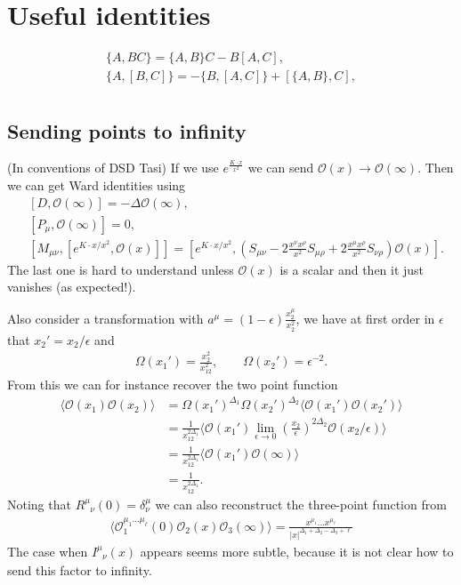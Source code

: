 \documentclass[letterpaper]{article}
\let\Oldsection\section
\renewcommand{\section}{\FloatBarrier\Oldsection}
\let\Oldsubsection\subsection
\renewcommand{\subsection}{\FloatBarrier\Oldsubsection}
\def\Om{{\mathcal{O}}}
\def\ph{\phantom}
\def \ph{\phantom}
\begin{document}
\section{Useful identities}

\begin{align}
 \{ A, B C \} = \{ A, B \} C - B [A, C], \\
 \{ A, [B, C] \} = - \{ B, [A, C] \}  + [ \{A, B \}, C], \\
\end{align}

\subsection{Sending points to infinity}

(In conventions of DSD Tasi) If we use $e^{\frac{K \cdot x}{x^2}}$ we can send $\Om(x) \to \Om(\infty)$. Then we can get Ward identities using
\begin{align}
 & [D, \Om(\infty)] = -\Delta \Om(\infty), \\
 & [P_\mu, \Om(\infty)] = 0, \\
 & [M_{\mu\nu}, [e^{K\cdot x/x^2}, \Om(x)]] 
 = \left[ e^{K\cdot x/x^2}, \left(
    S_{\mu\nu} 
    - 2 \frac{x^\nu x^\rho}{x^2} S_{\mu\rho}
    + 2 \frac{x^\mu x^\rho}{x^2} S_{\nu\rho}
 \right) \Om(x) \right].
\end{align}
The last one is hard to understand unless $\Om(x)$ is a scalar and then it just vanishes (as expected!).

Also consider a transformation with $a^\mu = (1-\epsilon) \frac{x_2^\mu}{x_2^2}$, we have at first order in $\epsilon$ that $x_2' = x_2 / \epsilon$ and
\begin{align}
 \Omega(x_1') = \frac{x_2^2}{x_{12}^2}, \qquad
 \Omega(x_2') = \epsilon^{-2}.
\end{align}
From this we can for instance recover the two point function
\begin{align}
 \langle \Om(x_1) \Om(x_2) \rangle
 & = \Omega(x_1')^{\Delta_1} \Omega(x_2')^{\Delta_2} \langle \Om(x_1') \Om(x_2') \rangle \\
 & = \frac{1}{x_{12}^{2\Delta_1}} \langle \Om(x_1') 
     \lim_{\epsilon\to0} \left( \frac{x_2}{\epsilon}\right)^{2\Delta_2} \Om(x_2/\epsilon) 
     \rangle \\
 & = \frac{1}{x_{12}^{2\Delta_1}} \langle \Om(x_1') \Om(\infty) \rangle \\
 & = \frac{1}{x_{12}^{2\Delta_1}}.
\end{align}
Noting that $R^\mu_{\ph \mu\nu}(0) = \delta^\mu_\nu$ we can also reconstruct the three-point function from
\begin{align}
 \langle \Om_1^{\mu_1 \ldots \mu_\ell}(0) \Om_2(x) \Om_3(\infty) \rangle
 = \frac{x^{\mu_1} \ldots x^{\mu_\ell} }{|x|^{\Delta_1 + \Delta_2 - \Delta_3 + \ell}}
\end{align}
The case when $I^\mu_{\ph \mu\nu}(x)$ appears seems more subtle, because it is not clear how to send this factor to infinity.
\end{document}
